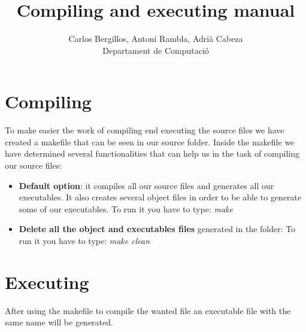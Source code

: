 \documentclass[12pt]{article}
\author{Carlos Bergillos, Antoni Rambla, Adrià Cabeza\\ Departament de Computació}
\title{Compiling and executing manual}
\begin{document}
  \maketitle  
   \newpage
   \section{Compiling}
   To make easier the work of compiling end executing the source files we have created a makefile that can be seen in our source folder. Inside the makefile we have determined several functionalities that can help us in the task of compiling our source files:
   
   \begin{itemize}
   \item \textbf{Default option}: it compiles all our source files and generates all our executables. It also creates several object files in order to be able to generate some of our executables. 
   To run it you have to type: \textit{make}
   \item \textbf{Delete all the object and executables files} generated in the folder:
   To run it you have to type: \textit{make clean}
   \end{itemize}
      \section{Executing}
         After using the makefile to compile the wanted file an executable file with the same name will be generated.\\
            
\end{document}
